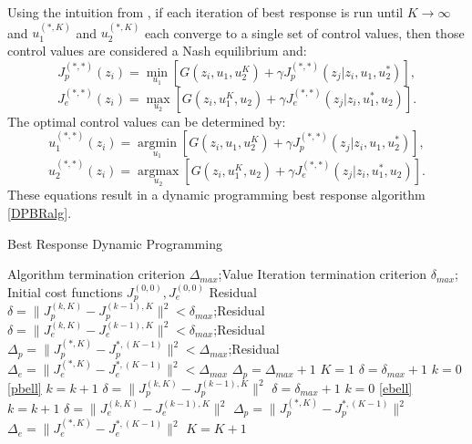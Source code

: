 Using the intuition from , if each iteration of best response is run until $K \rightarrow \infty$ and $u_1^{(*,K)}$ and $u_2^{(*,K)}$ each converge to a single set of control values, then those control values are considered a Nash equilibrium and:
\begin{equation}\label{pbropt}
J_p^{(*,*)}(z_i)= \underset{u_1 }{\operatorname{min }}[G(z_i,u_1,u_2^K)+\gamma J_p^{(*,*)}(z_j|z_i,u_1,u_2^*)],
\end{equation}
\begin{equation}\label{ebropt}
J_e^{(*,*)}(z_i)= \underset{u_2 }{\operatorname{max }}[G(z_i,u_1^K,u_2)+\gamma J_e^{(*,*)}(z_j|z_i,u_1^*,u_2)].
\end{equation}
The optimal control values can be determined by:
\begin{equation}\label{pbrcont}
u_1^{(*,*)}(z_i)= \underset{u_1 }{\operatorname{arg min }}[G(z_i,u_1,u_2^K)+\gamma J_p^{(*,*)}(z_j|z_i,u_1,u_2^*)],
\end{equation}
\begin{equation}\label{ebrcont}
u_2^{(*,*)}(z_i)= \underset{u_2 }{\operatorname{arg max }}[G(z_i,u_1^K,u_2)+\gamma J_e^{(*,*)}(z_j|z_i,u_1^*,u_2)].
\end{equation}
These equations result in a dynamic programming best response algorithm \ref{DPBRalg}.    
\begin{algorithm}
\caption{Best Response Dynamic Programming }\label{DPBRalg}
\begin{algorithmic}[1]
	\Require Algorithm termination criterion $\Delta_{max}$;Value Iteration termination criterion $\delta_{max}$; Initial cost functions $J_p^{(0,0)},J_e^{(0,0)}$
	\Ensure Residual $\delta=\|J_p^{(k,K)}-J_p^{(k-1),K}\|^2<\delta_{max}$;Residual $\delta=\|J_e^{(k,K)}-J_e^{(k-1),K}\|^2<\delta_{max}$;Residual $\Delta_p=\|J_p^{(*,K)}-J_p^{*,(K-1)}\|^2<\Delta_{max}$;Residual $\Delta_e=\|J_e^{(*,K)}-J_e^{*,(K-1)}\|^2<\Delta_{max}$
	\State $\Delta_p = \Delta_{max} + 1$
	\State $K = 1$
	 \do{}
		\State $\delta = \delta_{max} + 1$
		\State $k = 0$
		 \do{}
				\State \ref{pbell}
			\EndFor
			\State $k = k+1$
			\State $\delta = \|J_p^{(k,K)}-J_p^{(k-1),K}\|^2$
		\EndWhile
		\State $\delta = \delta_{max} + 1$
		\State $k = 0$
		 \do{}
				\State \ref{ebell}
			\EndFor
			\State $k = k+1$
			\State $\delta = \|J_e^{(k,K)}-J_e^{(k-1),K}\|^2$
		\EndWhile
		\State $\Delta_p = \|J_p^{(*,K)}-J_p^{*,(K-1)}\|^2$
		\State $\Delta_e = \|J_e^{(*,K)}-J_e^{*,(K-1)}\|^2$
		\State $K = K+1$
	\EndWhile
\end{algorithmic}
\end{algorithm}

